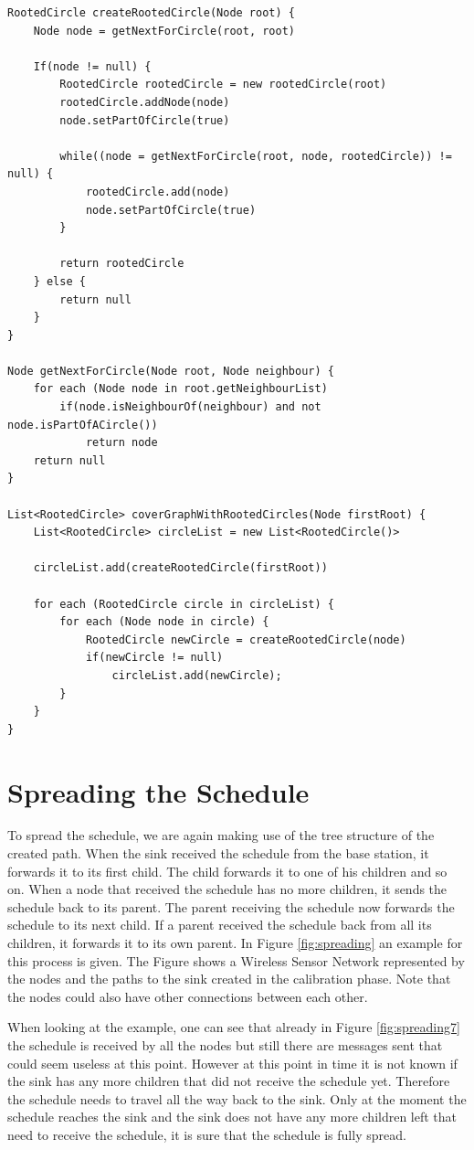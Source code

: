 \begin{lstlisting}
RootedCircle createRootedCircle(Node root) {
	Node node = getNextForCircle(root, root)	

	If(node != null) {
		RootedCircle rootedCircle = new rootedCircle(root)
		rootedCircle.addNode(node)
		node.setPartOfCircle(true)

		while((node = getNextForCircle(root, node, rootedCircle)) != null) {
			rootedCircle.add(node)
			node.setPartOfCircle(true)
		}

		return rootedCircle
	} else {
		return null
	}
}

Node getNextForCircle(Node root, Node neighbour) {
	for each (Node node in root.getNeighbourList)	
		if(node.isNeighbourOf(neighbour) and not node.isPartOfACircle())
			return node
	return null
}

List<RootedCircle> coverGraphWithRootedCircles(Node firstRoot) {
	List<RootedCircle> circleList = new List<RootedCircle()>
	
	circleList.add(createRootedCircle(firstRoot))

	for each (RootedCircle circle in circleList) {
		for each (Node node in circle) {
			RootedCircle newCircle = createRootedCircle(node)
			if(newCircle != null)
				circleList.add(newCircle);
		}
	}
}
\end{lstlisting}

\section{Spreading the Schedule}
\label{chp:apr_spreadingSchedule}
To spread the schedule, we are again making use of the tree structure of the created path. When the sink received the schedule from the base station, it forwards it to its first child. The child forwards it to one of his children and so on. When a node that received the schedule has no more children, it sends the schedule back to its parent. The parent receiving the schedule now forwards the schedule to its next child. If a parent received the schedule back from all its children, it forwards it to its own parent. In Figure \ref{fig:spreading} an example for this process is given. The Figure shows a Wireless Sensor Network represented by the nodes and the paths to the sink created in the calibration phase. Note that the nodes could also have other connections between each other. 

When looking at the example, one can see that already in Figure \ref{fig:spreading7} the schedule is received by all the nodes but still there are messages sent that could seem useless at this point. However at this point in time it is not known if the sink has any more children that did not receive the schedule yet. Therefore the schedule needs to travel all the way back to the sink. Only at the moment the schedule reaches the sink and the sink does not have any more children left that need to receive the schedule, it is sure that the schedule is fully spread.

